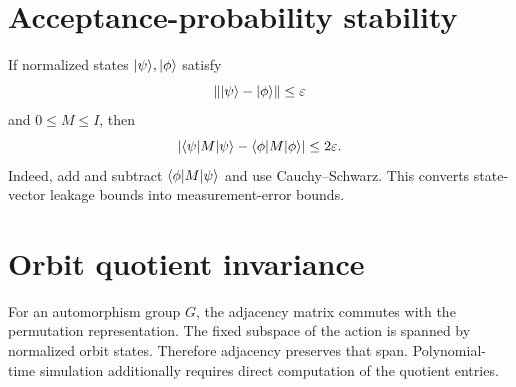 \section{Acceptance-probability stability}
If normalized states $\lvert \psi\rangle,\lvert \phi\rangle$ satisfy
\[
\|\lvert \psi\rangle-\lvert \phi\rangle\|\le\varepsilon
\]
and $0\le M\le I$, then
\[
|\langle \psi\rvert M\lvert \psi\rangle-\langle \phi\rvert M\lvert \phi\rangle|
\le 2\varepsilon.
\]
Indeed, add and subtract $\langle \phi\rvert M\lvert \psi\rangle$ and use Cauchy--Schwarz. This converts state-vector leakage bounds into measurement-error bounds.

\section{Orbit quotient invariance}
For an automorphism group $G$, the adjacency matrix commutes with the permutation representation. The fixed subspace of the action is spanned by normalized orbit states. Therefore adjacency preserves that span. Polynomial-time simulation additionally requires direct computation of the quotient entries.

